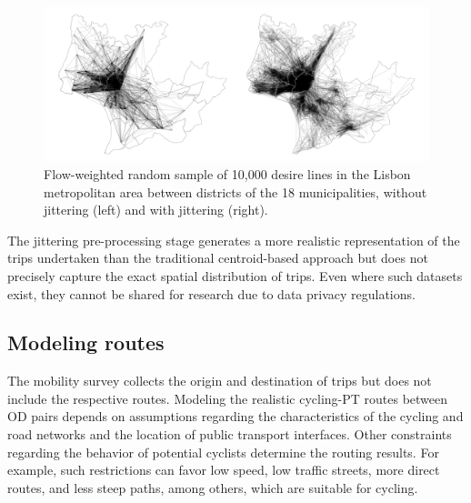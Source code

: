 \documentclass[review, doubleblind, 3p,
authoryear]{elsarticle} %
\begin{document}
\begin{figure}

{\centering \includegraphics[width=1\linewidth,]{img/jitter_cairo} 

}

\caption{Flow-weighted random sample of 10,000 desire lines in the Lisbon metropolitan area between districts of the 18 municipalities, without jittering (left) and with jittering (right).}\label{fig:jitter}
\end{figure}

The jittering pre-processing stage generates a more realistic
representation of the trips undertaken than the traditional
centroid-based approach but does not precisely capture the exact spatial
distribution of trips. Even where such datasets exist, they cannot be
shared for research due to data privacy regulations.

\subsection{Modeling routes}\label{modeling-routes}

The mobility survey collects the origin and destination of trips but
does not include the respective routes. Modeling the realistic
cycling-PT routes between OD pairs depends on assumptions regarding the
characteristics of the cycling and road networks and the location of
public transport interfaces. Other constraints regarding the behavior of
potential cyclists determine the routing results. For example, such
restrictions can favor low speed, low traffic streets, more direct
routes, and less steep paths, among others, which are suitable for
cycling.
\end{document}
